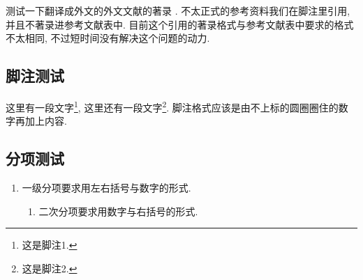 




测试一下翻译成外文的外文文献的著录 \cite{sally_history_1985}. 不太正式的参考资料我们在脚注里引用, 并且不著录进参考文献表中. 目前这个引用的著录格式与参考文献表中要求的格式不太相同, 不过短时间没有解决这个问题的动力.

\zhlipsum[1]

\subsection{脚注测试}

这里有一段文字\footnote{这是脚注1.}, 这里还有一段文字\footnote{这是脚注2.}. 脚注格式应该是由不上标的圆圈圈住的数字再加上内容.

\zhlipsum

\subsection{分项测试}

\begin{enumerate}
  \item 一级分项要求用左右括号与数字的形式.
  \begin{enumerate}
    \item 二次分项要求用数字与右括号的形式.
  \end{enumerate}
\end{enumerate}

\zhlipsum[1]
